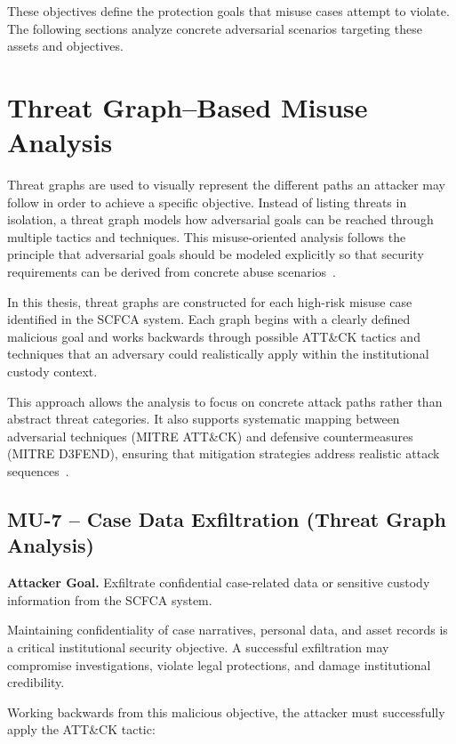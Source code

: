 \documentclass[12pt,a4paper]{report}
\begin{document}
These objectives define the protection goals that misuse cases attempt to violate. The following sections analyze concrete adversarial scenarios targeting these assets and objectives.

\section{Threat Graph–Based Misuse Analysis}

Threat graphs are used to visually represent the different paths an attacker may follow in order to achieve a specific objective. Instead of listing threats in isolation, a threat graph models how adversarial goals can be reached through multiple tactics and techniques.
This misuse-oriented analysis follows the principle that adversarial goals should be modeled explicitly so that security requirements can be derived from concrete abuse scenarios~\cite{Sindre2001,Choi2006}.

In this thesis, threat graphs are constructed for each high-risk misuse case identified in the SCFCA system. Each graph begins with a clearly defined malicious goal and works backwards through possible ATT\&CK tactics and techniques that an adversary could realistically apply within the institutional custody context.

This approach allows the analysis to focus on concrete attack paths rather than abstract threat categories. It also supports systematic mapping between adversarial techniques (MITRE ATT\&CK) and defensive countermeasures (MITRE D3FEND), ensuring that mitigation strategies address realistic attack sequences~\cite{MITREATTACK,MITRED3FEND}.

\subsection{MU-7 – Case Data Exfiltration (Threat Graph Analysis)}

\textbf{Attacker Goal.}  
Exfiltrate confidential case-related data or sensitive custody information from the SCFCA system.

Maintaining confidentiality of case narratives, personal data, and asset records is a critical institutional security objective. A successful exfiltration may compromise investigations, violate legal protections, and damage institutional credibility.

Working backwards from this malicious objective, the attacker must successfully apply the ATT\&CK tactic:
\end{document}

